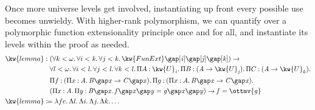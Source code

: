\documentclass[a4paper,UKenglish,cleveref,autoref,thm-restate]{lipics-v2021}
\begin{document}
Once more universe levels get involved,
instantiating up front every possible use becomes unwieldy.
With higher-rank polymorphism,
we can quantify over a polymorphic function extensionality principle once and for all,
and instantiate its levels within the proof as needed.
%
\begin{align*}
   \kw{ lemma }  &:   (     \forall  k  <   \omega   \mathpunct{.}   \forall  i  <   \mathit{ k }   \mathpunct{.}   \forall  j  <   \mathit{ k }   \mathpunct{.}   \kw{ FunExt }      \gap [   \mathit{ i }   ]   \gap [   \mathit{ j }   ]   \gap [   \mathit{ k }   ]  )   \to   \relax   \\
  &\phantom{{} : {}}  \forall  l  <   \omega   \mathpunct{.}   \forall  i  <   \mathit{ l }   \mathpunct{.}   \forall  j  <   \mathit{ l }   \mathpunct{.}   \forall  k  <   \mathit{ l }   \mathpunct{.}   \Pi  A  \mathbin{:}   \kw{U}_{  \mathit{ i }  }   \mathpunct{.}   \Pi  B  \mathbin{:}   (   \mathit{ A }   \to   \kw{U}_{  \mathit{ j }  }   )   \mathpunct{.}   \Pi  C  \mathbin{:}   (   \mathit{ A }   \to   \kw{U}_{  \mathit{ k }  }   )   \mathpunct{.}   \relax         \\
  &\phantom{{} : {}}  \Pi  f  \mathbin{:}   (     \Pi  x  \mathbin{:}   \mathit{ A }   \mathpunct{.}   \mathit{ B }    \gap   \mathit{ x }    \to   \mathit{ C }    \gap   \mathit{ x }   )   \mathpunct{.}   \Pi  g  \mathbin{:}   (     \Pi  x  \mathbin{:}   \mathit{ A }   \mathpunct{.}   \mathit{ B }    \gap   \mathit{ x }    \to   \mathit{ C }    \gap   \mathit{ x }   )   \mathpunct{.}   \relax    \\
  &\phantom{{} : {}}   (       \Pi  x  \mathbin{:}   \mathit{ A }   \mathpunct{.}   \Pi  y  \mathbin{:}    \mathit{ B }   \gap   \mathit{ x }    \mathpunct{.}   \mathit{ f }     \gap   \mathit{ x }    \gap   \mathit{ y }    =   \mathit{ g }    \gap   \mathit{ x }    \gap   \mathit{ y }   )   \to     \mathit{ f }   =   \mathit{ \ottmv{g} }     \\
   \kw{ lemma }  &\coloneqq  \lambda  fe  \mathpunct{.}   \Lambda  l  \mathpunct{.}   \Lambda  i  \mathpunct{.}   \Lambda  j  \mathpunct{.}   \Lambda  k  \mathpunct{.}   \relax       \dots
\end{align*}
\end{document}
